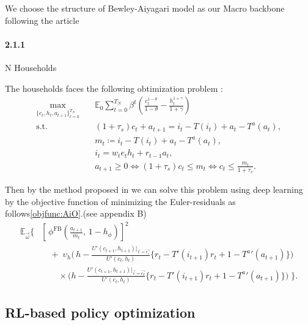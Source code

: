 \documentclass[11pt]{article}
\begin{document}
We choose the structure of Bewley-Aiyagari model as our Macro backbone following the article \cite{mi2023taxai}

\paragraph{2.1.1} N Households

The households faces the following obtimization problem :
\begin{equation}
\begin{aligned}
\max_{\{c_t,h_t,a_{t+1}\}_{t=0}^{T_N}} \quad 
& \mathbb{E}_0 \sum_{t=0}^{T_N} \beta^t 
\left( \frac{c_t^{1-\theta}}{1-\theta} - \frac{h_t^{1+\gamma}}{1+\gamma} \right) \\[4pt]
\text{s.t.}\quad 
& (1+\tau_s)c_t + a_{t+1} = i_t - T(i_t) + a_t - T^{a}(a_t), \\
& m_t \coloneqq i_t - T(i_t) + a_t - T^{a}(a_t),\\
& i_t = w_t e_t h_t + r_{t-1} a_t,\\
& a_{t+1} \ge 0 \iff (1+\tau_s)c_t \le m_t \iff c_t \le \frac{m_t}{1+\tau_s}.
\end{aligned}
\tag{1}
\end{equation}

Then by the method proposed in \cite{maliar2021deep} 
we can solve this problem using deep learning by the objective function 
of minimizing the Euler-residuals as follows\ref{objfunc:AiO}.(see appendix B) 
\begin{equation}
\begin{aligned}
\mathbb{E}_{\vec{\omega}} \Big\{ &
    \left[\,
      \phi^{\text{FB}}\!\left(
        \tfrac{a_{t+1}}{m_t},\,
        1 - h_{\phi}
      \right)
    \right]^2
    \\
    &\quad +\;
    \upsilon_h \Bigg(
      \,h - 
      \frac{U'(c_{t+1},h_{t+1})|_{\vec{\epsilon}=\vec{\epsilon_1}}}
           {U'(c_t,h_t)}
      \Big\{ r_t - T'(i_{t+1}) r_t + 1 - {T^a}'(a_{t+1}) \Big\}
    \Bigg)
    \\
    &\qquad \times
    \Bigg(
      h - 
      \frac{U'(c_{t+1},h_{t+1})|_{\vec{\epsilon}=\vec{\epsilon_2}}}
           {U'(c_t,h_t)}
      \Big\{ r_t - T'(i_{t+1}) r_t + 1 - {T^a}'(a_{t+1}) \Big\}
    \Bigg)
\;\Big\}.
\end{aligned}\tag{2}
\end{equation}
\subsection{RL-based policy optimization}
\end{document}
